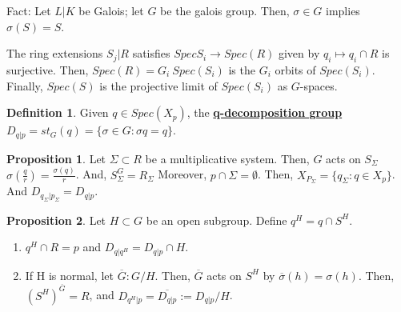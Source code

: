 \documentclass{article}
\theoremstyle{definition}
\theoremstyle{definition}
\theoremstyle{definition}
\newtheorem{proposition}{Proposition}[section]
\theoremstyle{definition}
\theoremstyle{definition}
\newtheorem{definition}{Definition}[section]
\theoremstyle{definition}
\theoremstyle{definition}
\begin{document}
Fact: Let $L|K$ be Galois; let $G$ be the galois group. Then, $\sigma\in G$ implies $\sigma(S)=S$. 



The ring extensions $S_j|R$ satisfies $Spec S_i\to Spec(R)$ given by $q_i\mapsto q_i\cap R$ is surjective. Then, $Spec(R)=G_i\ Spec(S_i)$ is the $G_i$ orbits of $Spec(S_i)$. Finally, $Spec(S)$ is the projective limit of $Spec(S_i)$ as $G$-spaces. 


\begin{tcolorbox}[colback=purple!5!white,colframe=purple!75!black]
\begin{definition}
Given $q\in Spec(X_p)$, the \underline{\textbf{q-decomposition group}} $D_{q|p}=st_G(q)=\{ \sigma\in G:\sigma q=q \}$. 
\end{definition}
\end{tcolorbox}


\begin{tcolorbox}[colback=blue!5!white,colframe=blue!30!white]
\begin{proposition}
Let $\Sigma\subset R$ be a multiplicative system. Then, $G$ acts on $S_{\Sigma}$ $\sigma(\frac{q}{r})=\frac{\sigma(q)}{r}$. And, $S^G_{\Sigma}=R_{\Sigma}$ Moreover, $p\cap \Sigma=\emptyset$. Then, $X_{P_{\Sigma}}=\{ q_{\Sigma}: q\in X_p \}$. And $D_{q_{\Sigma}|p_{\Sigma}}=D_{q|p}$. 

\end{proposition}
\end{tcolorbox}


\begin{tcolorbox}[colback=blue!5!white,colframe=blue!30!white]
\begin{proposition}
Let $H\subset G$ be an open subgroup. Define $q^H=q\cap S^H$. 

\begin{enumerate}
    \item  $q^H\cap R=p$ and  $D_{q|q^H}=D_{q|p}\cap H$.
    \item If H is normal, let $\overline{G}: G/H$. Then, $\overline{G}$ acts on $S^H$ by $\overline{\sigma}(h)=\sigma(h)$.  Then, $(S^H)^{\overline{G}}=R$, and $D_{q^H|p}=\overline{D_{q|p}}:=D_{q|p}/H$.
\end{enumerate}
\end{proposition}
\end{tcolorbox}
\end{document}
